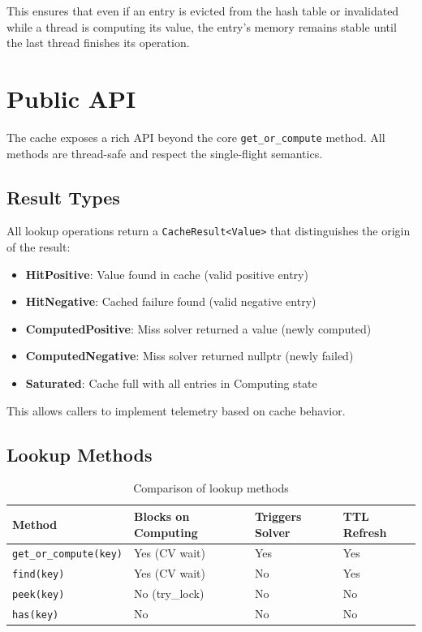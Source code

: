 \documentclass[11pt,a4paper]{article}
\begin{document}
This ensures that even if an entry is evicted from the hash table or 
invalidated while a thread is computing its value, the entry's memory 
remains stable until the last thread finishes its operation.

\section{Public API}

The cache exposes a rich API beyond the core \texttt{get\_or\_compute} method.
All methods are thread-safe and respect the single-flight semantics.

\subsection{Result Types}

All lookup operations return a \texttt{CacheResult<Value>} that distinguishes
the origin of the result:

\begin{itemize}
\item \textbf{HitPositive}: Value found in cache (valid positive entry)
\item \textbf{HitNegative}: Cached failure found (valid negative entry)
\item \textbf{ComputedPositive}: Miss solver returned a value (newly computed)
\item \textbf{ComputedNegative}: Miss solver returned nullptr (newly failed)
\item \textbf{Saturated}: Cache full with all entries in Computing state
\end{itemize}

This allows callers to implement telemetry based on cache behavior.

\subsection{Lookup Methods}

\begin{table}[htbp]
\centering
\begin{tabular}{@{}llll@{}}
\toprule
Method & Blocks on Computing & Triggers Solver & TTL Refresh \\
\midrule
\texttt{get\_or\_compute(key)} & Yes (CV wait) & Yes & Yes \\
\texttt{find(key)} & Yes (CV wait) & No & Yes \\
\texttt{peek(key)} & No (try\_lock) & No & No \\
\texttt{has(key)} & No & No & No \\
\bottomrule
\end{tabular}
\caption{Comparison of lookup methods}
\end{table}
\end{document}
